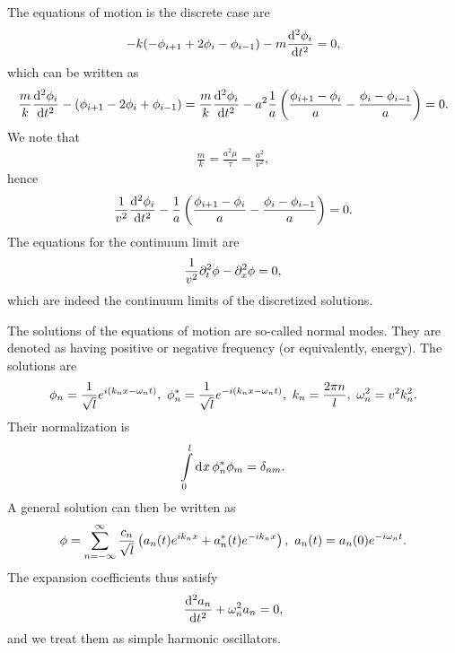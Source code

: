 The equations of motion is the discrete case are
\begin{align*}
	-k(-\phi_{i + 1} + 2\phi_{i} - \phi_{i - 1}) - m\dv[2]{\phi_{i}}{t} = 0,
\end{align*}
which can be written as
\begin{align*}
	\frac{m}{k}\dv[2]{\phi_{i}}{t} - \left(\phi_{i + 1} - 2\phi_{i} + \phi_{i - 1}\right) = \frac{m}{k}\dv[2]{\phi_{i}}{t} - a^{2}\frac{1}{a}\left(\frac{\phi_{i + 1} - \phi_{i}}{a} - \frac{\phi_{i} - \phi_{i - 1}}{a}\right) = 0.
\end{align*}
We note that
\begin{align*}
	\frac{m}{k} = \frac{a^{2}\mu}{\tau} = \frac{a^{2}}{v^{2}},
\end{align*}
hence
\begin{align*}
	\frac{1}{v^{2}}\dv[2]{\phi_{i}}{t} - \frac{1}{a}\left(\frac{\phi_{i + 1} - \phi_{i}}{a} - \frac{\phi_{i} - \phi_{i - 1}}{a}\right) = 0.
\end{align*}
The equations for the continuum limit are
\begin{align*}
	\frac{1}{v^{2}}\partial^{2}_{t}\phi - \partial^{2}_{x}\phi = 0,
\end{align*}
which are indeed the continuum limits of the discretized solutions.

The solutions of the equations of motion are so-called normal modes. They are denoted as having positive or negative frequency (or equivalently, energy). The solutions are
\begin{align*}
	\phi_{n} = \frac{1}{\sqrt{l}}e^{i(k_{n}x - \omega_{n}t)},\ \cc{\phi_{n}} = \frac{1}{\sqrt{l}}e^{-i(k_{n}x - \omega_{n}t)},\ k_{n} = \frac{2\pi n}{l},\ \omega_{n}^{2} = v^{2}k_{n}^{2}.
\end{align*}
Their normalization is
\begin{align*}
	\int\limits_{0}^{l}\dd[]{x}\phi_{n}^{*}\phi_m = \delta_{nm}.
\end{align*}
A general solution can then be written as
\begin{align*}
	\phi = \sum\limits_{n = -\infty}^{\infty}\frac{c_{n}}{\sqrt{l}}\left(a_{n}(t)e^{ik_{n}x} + a_{n}^{*}(t)e^{-ik_{n}x}\right),\ a_{n}(t) = a_{n}(0)e^{-i\omega_{n}t}.
\end{align*}
The expansion coefficients thus satisfy
\begin{align*}
	\dv[2]{a_{n}}{t} + \omega_{n}^{2}a_{n} = 0,
\end{align*}
and we treat them as simple harmonic oscillators.

